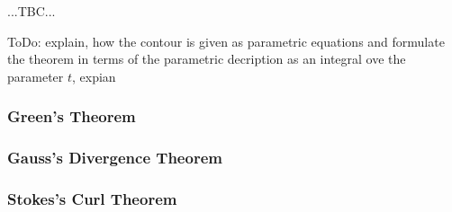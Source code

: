 ...TBC...

ToDo: explain, how the contour is given as parametric equations and formulate the theorem in terms of the parametric decription as an integral ove the parameter $t$, expian



\subsubsection{Green's Theorem}
\subsubsection{Gauss's Divergence Theorem}
\subsubsection{Stokes's Curl Theorem}





\begin{comment}

-make a section for how to compute potentials for a given evctor field
-before that, have a section for how to test, if a potential even exists 

-i'm not sure, if path integrals and surface integrals should be treated here or in the "General Concepts" section ...maybe here - there, we only do integrals of scalar fields

\end{comment}

